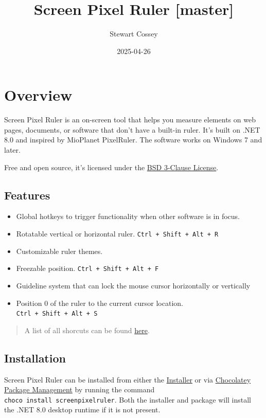 \documentclass[
]{book}
\title{Screen Pixel Ruler {[}master{]}}
\author{Stewart Cossey}
\date{2025-04-26}
\providecommand{\tightlist}{%
  \setlength{\itemsep}{0pt}\setlength{\parskip}{0pt}}
\begin{document}
\maketitle

{
\setcounter{tocdepth}{1}
\tableofcontents
}
\chapter{Overview}\label{overview}

Screen Pixel Ruler is an on-screen tool that helps you measure elements on web pages, documents, or software that don't have a built-in ruler.
It's built on .NET 8.0 and inspired by MioPlanet PixelRuler.
The software works on Windows 7 and later.

Free and open source, it's licensed under the \href{https://opensource.org/licenses/BSD-3-Clause}{BSD 3-Clause License}.

\section{Features}\label{features}

\begin{itemize}
\tightlist
\item
  Global hotkeys to trigger functionality when other software is in focus.
\item
  Rotatable vertical or horizontal ruler. \texttt{Ctrl\ +\ Shift\ +\ Alt\ +\ R}
\item
  Customizable ruler themes.
\item
  Freezable position. \texttt{Ctrl\ +\ Shift\ +\ Alt\ +\ F}
\item
  Guideline system that can lock the mouse cursor horizontally or vertically
\item
  Position 0 of the ruler to the current cursor location. \texttt{Ctrl\ +\ Shift\ +\ Alt\ +\ S}
\end{itemize}

\begin{quote}
A list of all shorcuts can be found \hyperref[keyboard]{here}.
\end{quote}

\section{Installation}\label{installation}

Screen Pixel Ruler can be installed from either the \href{https://github.com/Cossey/ScreenPixelRuler2/releases}{Installer} or via \href{https://chocolatey.org}{Chocolatey Package Management} by running the command \texttt{choco\ install\ screenpixelruler}.
Both the installer and package will install the .NET 8.0 desktop runtime if it is not present.
\end{document}
